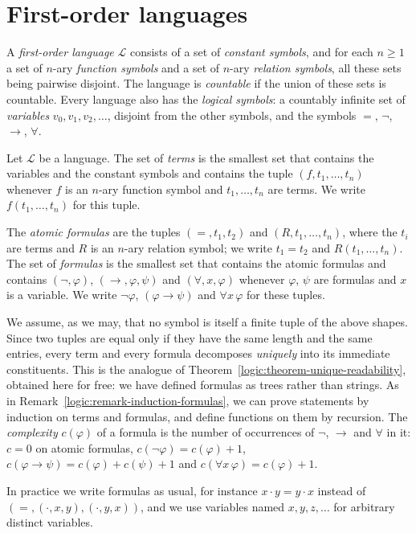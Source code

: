 \section{First-order languages}\label{logic:section-languages}

\begin{definition}\label{logic:definition-language}
A \emph{first-order language} $\mathcal{L}$ consists of a set of
\emph{constant symbols}, and for each $n \geq 1$ a set of $n$-ary
\emph{function symbols} and a set of $n$-ary \emph{relation symbols}, all these
sets being pairwise disjoint. The language is \emph{countable} if the union
of these sets is countable. Every language also has the \emph{logical symbols}:
a countably infinite set of \emph{variables} $v_0, v_1, v_2, \ldots$, disjoint
from the other symbols, and the symbols $=$, $\neg$, $\to$, $\forall$.
\end{definition}

\begin{definition}\label{logic:definition-terms-formulas}
Let $\mathcal{L}$ be a language. The set of \emph{terms} is the smallest set
that contains the variables and the constant symbols and contains the tuple
$(f, t_1, \ldots, t_n)$ whenever $f$ is an $n$-ary function symbol and
$t_1, \ldots, t_n$ are terms. We write $f(t_1, \ldots, t_n)$ for this tuple.

The \emph{atomic formulas} are the tuples $(=, t_1, t_2)$ and
$(R, t_1, \ldots, t_n)$, where the $t_i$ are terms and $R$ is an $n$-ary relation
symbol; we write $t_1 = t_2$ and $R(t_1, \ldots, t_n)$. The set of
\emph{formulas} is the smallest set that contains the atomic formulas and
contains $(\neg, \varphi)$, $(\to, \varphi, \psi)$ and $(\forall, x, \varphi)$
whenever $\varphi$, $\psi$ are formulas and $x$ is a variable. We write
$\neg\varphi$, $(\varphi \to \psi)$ and $\forall x\, \varphi$ for these tuples.
\end{definition}

\begin{remark}\label{logic:remark-syntax-trees}
We assume, as we may, that no symbol is itself a finite tuple of the above
shapes. Since two tuples are equal only if they have the same length and the
same entries, every term and every formula decomposes \emph{uniquely} into its
immediate constituents. This is the analogue of
Theorem~\ref{logic:theorem-unique-readability}, obtained here for free: we
have defined formulas as trees rather than strings. As in
Remark~\ref{logic:remark-induction-formulas}, we can prove statements by
induction on terms and formulas, and define functions on them by recursion.
The \emph{complexity} $c(\varphi)$ of a formula is the number of occurrences
of $\neg$, $\to$ and $\forall$ in it: $c = 0$ on atomic formulas,
$c(\neg\varphi) = c(\varphi) + 1$, $c(\varphi \to \psi) = c(\varphi) + c(\psi) + 1$
and $c(\forall x\,\varphi) = c(\varphi) + 1$.

In practice we write formulas as usual, for instance $x \cdot y = y \cdot x$
instead of $(=, (\cdot, x, y), (\cdot, y, x))$, and we use variables named
$x, y, z, \ldots$ for arbitrary distinct variables.
\end{remark}

